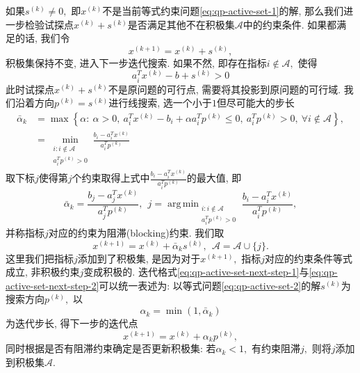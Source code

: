 \documentclass{SBCbookchapter}
\DeclareMathOperator*{\argmin}{arg\,min}
\numberwithin{equation}{section}
\begin{document}
如果$s^{(k)} \neq 0,$ 即$x^{(k)}$不是当前等式约束问题\eqref{eq:qp-active-set-1}的解, 那么我们进一步检验试探点$x^{(k)} + s^{(k)}$是否满足其他不在积极集$\mathcal{A}$中的约束条件. 如果都满足的话, 我们令
\begin{equation}
\label{eq:qp-active-set-next-step-1}
x^{(k+1)} = x^{(k)} + s^{(k)},
\end{equation}
积极集保持不变, 进入下一步迭代搜索. 如果不然, 即存在指标$i \not\in \mathcal{A},$ 使得
\begin{equation*}
a_i^T x^{(k)} - b + s^{(k)} > 0
\end{equation*}
此时试探点$x^{(k)} + s^{(k)}$不是原问题的可行点, 需要将其投影到原问题的可行域. 我们沿着方向$p^{(k)} = s^{(k)}$进行线搜索, 选一个小于$1$但尽可能大的步长
\begin{equation}
\label{eq:qp-active-set-step-len-1}
\begin{aligned}
\bar{\alpha}_k & = \max \left\{ \alpha : ~ \alpha > 0, ~ a_i^T x^{(k)} - b_i + \alpha a_i^T p^{(k)} \leqslant 0, ~ a_i^T p^{(k)} > 0, ~ \forall i \not\in \mathcal{A} \right\}, \\
& = \min_{\substack{i: i \not\in \mathcal{A} \\ a_i^T p^{(k)} > 0}} \frac{b_i - a_i^T x^{(k)}}{a_i^T p^{(k)}}
\end{aligned}
\end{equation}
取下标$j$使得第$j$个约束取得上式中$\frac{b_i - a_i^T x^{(k)}}{a_i^T p^{(k)}}$的最大值, 即
\begin{equation}
\label{eq:qp-active-set-step-len-2}
\bar{\alpha}_k = \frac{b_j - a_j^T x^{(k)}}{a_j^T p^{(k)}}, ~~ j = \argmin_{\substack{i: i \not\in \mathcal{A} \\ a_i^T p^{(k)} > 0}} \frac{b_i - a_i^T x^{(k)}}{a_i^T p^{(k)}},
\end{equation}
并称指标$j$对应的约束为阻滞(blocking)约束. 我们取
\begin{equation}
\label{eq:qp-active-set-next-step-2}
x^{(k+1)} = x^{(k)} + \bar{\alpha}_k s^{(k)}, ~~ \mathcal{A} = \mathcal{A} \cup \{ j \}.
\end{equation}
这里我们把指标$j$添加到了积极集, 是因为对于$x^{(k+1)},$ 指标$j$对应的约束条件等式成立, 非积极约束$j$变成积极的. 迭代格式\eqref{eq:qp-active-set-next-step-1}与\eqref{eq:qp-active-set-next-step-2}可以统一表述为: 以等式问题\eqref{eq:qp-active-set-2}的解$s^{(k)}$为搜索方向$p^{(k)},$ 以
\begin{equation}
\label{eq:qp-active-set-step-len-uniform}
\alpha_k = \min (1, \bar{\alpha}_k)
\end{equation}
为迭代步长, 得下一步的迭代点
\begin{equation}
\label{eq:qp-active-set-next-step-uniform}
x^{(k+1)} = x^{(k)} + \alpha_k p^{(k)},
\end{equation}
同时根据是否有阻滞约束确定是否更新积极集: 若$\alpha_k < 1,$ 有约束阻滞$j,$ 则将$j$添加到积极集$\mathcal{A}.$
\end{document}
